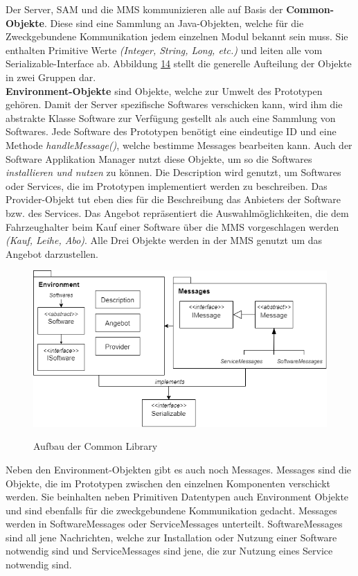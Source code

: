 Der Server, SAM und die MMS kommunizieren alle auf Basis der \textbf{Common-Objekte}. Diese sind eine Sammlung an Java-Objekten, welche für die Zweckgebundene Kommunikation jedem einzelnen Modul bekannt sein muss. Sie enthalten Primitive Werte \textit{(Integer, String, Long, etc.)} und leiten alle vom Serializable-Interface ab. Abbildung \hyperref[img:common]{14} stellt die generelle Aufteilung der Objekte in zwei Gruppen dar. \\

\textbf{Environment-Objekte} sind Objekte, welche zur Umwelt des Prototypen gehören. Damit der Server spezifische Softwares verschicken kann, wird ihm die abstrakte Klasse Software zur Verfügung gestellt als auch eine Sammlung von Softwares. Jede Software des Prototypen benötigt eine eindeutige ID und eine Methode \textit{handleMessage()}, welche bestimme Messages bearbeiten kann. Auch der Software Applikation Manager nutzt diese Objekte, um so die Softwares \textit{installieren und nutzen} zu können. Die Description wird genutzt, um Softwares oder Services, die im Prototypen implementiert werden zu beschreiben. Das Provider-Objekt tut eben dies für die Beschreibung das Anbieters der Software bzw. des Services. Das Angebot repräsentiert die Auswahlmöglichkeiten, die dem Fahrzeughalter beim Kauf einer Software über die MMS vorgeschlagen werden \textit{(Kauf, Leihe, Abo)}. Alle Drei Objekte werden in der MMS genutzt um das Angebot darzustellen.

\begin{figure}[!h]
	\centering
	\includegraphics[width=0.8\columnwidth]{pictures/konzept-Common.png}
	\label{img:common}
	\caption{Aufbau der Common Library}
\end{figure}

Neben den Environment-Objekten gibt es auch noch Messages. Messages sind die Objekte, die im Prototypen zwischen den einzelnen Komponenten verschickt werden. Sie beinhalten neben Primitiven Datentypen auch Environment Objekte und sind ebenfalls für die zweckgebundene Kommunikation gedacht. Messages werden in SoftwareMessages oder ServiceMessages unterteilt. SoftwareMessages sind all jene Nachrichten, welche zur Installation oder Nutzung einer Software notwendig sind und ServiceMessages sind jene, die zur Nutzung eines Service notwendig sind. 

